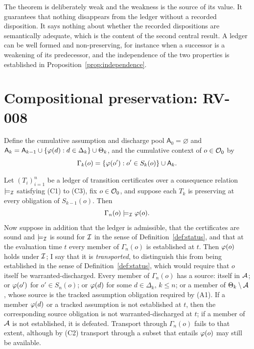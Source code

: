 The theorem is deliberately weak and the weakness is the source of its value. It guarantees that nothing disappears from the ledger without a recorded disposition. It says nothing about whether the recorded dispositions are semantically adequate, which is the content of the second central result. A ledger can be well formed and non-preserving, for instance when a successor is a weakening of its predecessor, and the independence of the two properties is established in Proposition~\ref{prop:independence}.

\section{Compositional preservation: RV-008}

Define the cumulative assumption and discharge pool $\mathsf{A}_0 = \varnothing$ and $\mathsf{A}_k = \mathsf{A}_{k-1} \cup \{\varphi(d) : d \in \Delta_k\} \cup \Theta_k$, and the cumulative context of $o \in \mathcal{O}_0$ by
\[
\Gamma_k(o) = \{\varphi(o') : o' \in S_k(o)\} \cup \mathsf{A}_k .
\]

\begin{theorem}
\label{thm:compose}
Let $(T_i)_{i=1}^n$ be a ledger of transition certificates over a consequence relation $\models_{\mathcal{I}}$ satisfying (C1) to (C3), fix $o \in \mathcal{O}_0$, and suppose each $T_k$ is preserving at every obligation of $S_{k-1}(o)$. Then
\[
\Gamma_n(o) \models_{\mathcal{I}} \varphi(o).
\]
Now suppose in addition that the ledger is admissible, that the certificates are sound and $\models_{\mathcal{I}}$ is sound for $\mathcal{I}$ in the sense of Definition~\ref{def:status}, and that at the evaluation time $t$ every member of $\Gamma_n(o)$ is established at $t$. Then $\varphi(o)$ holds under $\mathcal{I}$; I say that it is \emph{transported}, to distinguish this from being established in the sense of Definition~\ref{def:status}, which would require that $o$ itself be warranted-discharged. Every member of $\Gamma_n(o)$ has a source: itself in $\mathcal{A}$; or $\varphi(o')$ for $o'\in S_n(o)$; or $\varphi(d)$ for some $d\in\Delta_k$, $k\le n$; or a member of $\Theta_k\setminus\mathcal{A}$, whose source is the tracked assumption obligation required by (A1). If a member $\varphi(d)$ or a tracked assumption is not established at $t$, then the corresponding source obligation is not warranted-discharged at $t$; if a member of $\mathcal{A}$ is not established, it is defeated. Transport through $\Gamma_n(o)$ fails to that extent, although by (C2) transport through a subset that entails $\varphi(o)$ may still be available.
\end{theorem}

